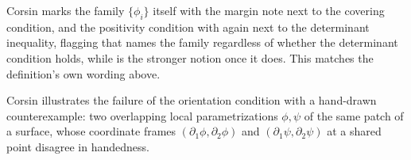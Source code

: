 \begin{ainote}
Corsin marks the family $\{\phi_i\}$ itself with the margin note  next
to the covering condition, and the positivity condition with  again next to the
determinant inequality, flagging that  names the family regardless of
whether the determinant condition holds, while  is the stronger notion once it
does. This matches the definition's own wording above.
\end{ainote}

Corsin illustrates the failure of the orientation condition with a hand-drawn counterexample:
two overlapping local parametrizations $\phi, \psi$ of the same patch of a surface, whose
coordinate frames $(\partial_1\phi,\partial_2\phi)$ and $(\partial_1\psi,\partial_2\psi)$ at a
shared point disagree in handedness.

